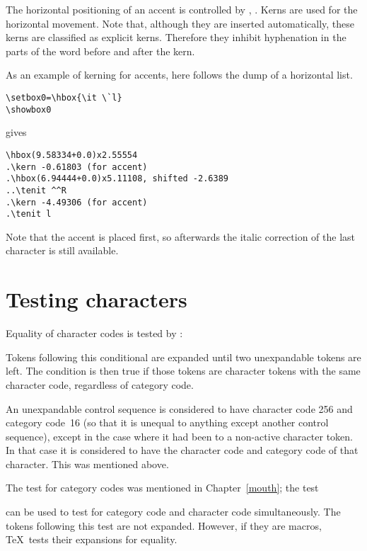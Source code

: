 The horizontal positioning of an accent is controlled by
, . Kerns are used
for the horizontal movement. Note that, although they
are inserted automatically, these kerns are classified
as {\italic explicit\/} kerns. Therefore they inhibit hyphenation
in the parts of the word before and after the kern.

As an example of kerning for accents, 
here follows the dump of a horizontal list.
\begin{verbatim}
\setbox0=\hbox{\it \`l}
\showbox0
\end{verbatim}
gives
\begin{verbatim}
\hbox(9.58334+0.0)x2.55554
.\kern -0.61803 (for accent)
.\hbox(6.94444+0.0)x5.11108, shifted -2.6389
..\tenit ^^R
.\kern -4.49306 (for accent)
.\tenit l
\end{verbatim}
Note that the accent is placed first, so afterwards the italic
correction of the last character is still available.

\section{Testing characters}

Equality of character codes is tested by :
\begin{disp}\end{disp}
Tokens following this conditional are expanded until two
unexpandable tokens are left. The condition is then true
if those tokens are character tokens with the same character
code, regardless of category code. 

An unexpandable control
sequence is considered to have character code 256 and
category code~16
(so that it is unequal to anything except
another control sequence), except in the case
where it had been  to a non-active character token.
In that case it is considered to have the character code
and category code of that character. This was mentioned above.

The test  for category codes was mentioned
in Chapter~\ref{mouth}; the test
\begin{disp}\end{disp}
can be used to test for category code and character code
simultaneously.
The tokens following this test are not expanded.
However, if they are macros, \TeX\
tests their expansions for equality.


